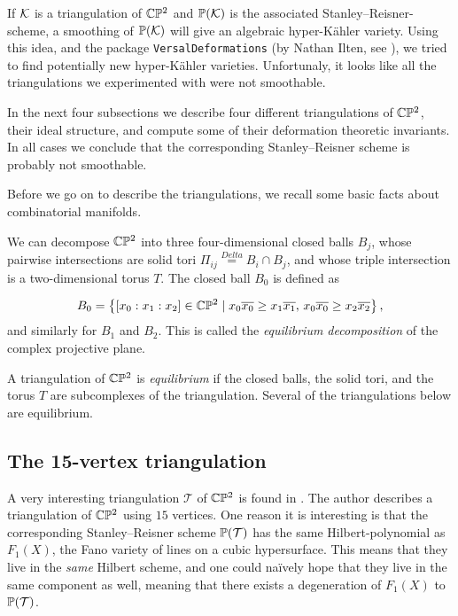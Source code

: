 If $\K$ is a triangulation of $\C \P^2$ and $\P(\K)$ is the associated Stanley--Reisner-scheme, a smoothing of $\P(\K)$ will give an algebraic hyper-Kähler variety. Using this idea, and the \MM package \texttt{VersalDeformations} (by Nathan Ilten, see \cite{ilten_versaldeformations}), we tried to find potentially new hyper-Kähler varieties. Unfortunaly, it looks like all the triangulations we experimented with were not smoothable.

In the next four subsections we describe four different triangulations of $\C \P^2$, their ideal structure, and compute some of their deformation theoretic invariants. In all cases we conclude that the corresponding Stanley--Reisner scheme is probably not smoothable.

Before we go on to describe the triangulations, we recall some basic facts about combinatorial manifolds.

We can decompose $\C \P^2$ into three four-dimensional closed balls $B_j$, whose pairwise intersections are solid tori $\Pi_{ij} \stackrel{Delta}= B_i \cap B_j$, and whose triple intersection is a two-dimensional torus $T$. The closed ball $B_0$ is defined as 

$$
B_0 = \left\{ [x_0:x_1:x_2] \in \C \P ^2 \mid x_0\overline{x_0} \geq x_1 \overline{x_1}, \,  x_0\overline{x_0} \geq x_2\overline{x_2} \right\},
$$
and similarly for $B_1$ and $B_2$. This is called the \emph{equilibrium decomposition} of the complex projective plane.

A triangulation of $\C \P^2$ is \emph{equilibrium} if the closed balls, the solid tori, and the torus $T$ are subcomplexes of the triangulation. Several of the triangulations below are equilibrium.

\subsection{The 15-vertex triangulation}

A very interesting triangulation $\mathcal T$ of $\C\P^2$ is found in \cite{cp2_15_chess}. The author describes a triangulation of $\C \P^2$ using $15$ vertices. One reason it is interesting is that the corresponding Stanley--Reisner scheme $\P(\mathcal T)$ has the same Hilbert-polynomial as $F_1(X)$, the Fano variety of lines on a cubic hypersurface. This means that they live in the \emph{same} Hilbert scheme, and one could naïvely hope that they live in the same component as well, meaning that there exists a degeneration of $F_1(X)$ to $\P(\mathcal T)$.

